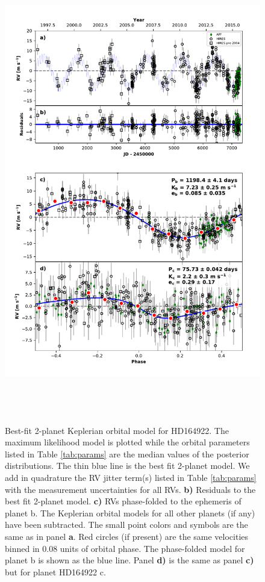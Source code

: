 \documentclass{emulateapj}
\begin{document}
\begin{figure}[!h]
\centering
\includegraphics[height=8.0in,width=6.0in,keepaspectratio]{HD164922_rv_multipanel.pdf}
\caption{
Best-fit 2-planet Keplerian orbital model for HD164922.
The maximum likelihood model is plotted while the orbital parameters listed in Table \ref{tab:params}
are the median values of the posterior distributions.
The thin blue line is the best fit 2-planet model. We add in quadrature the RV jitter term(s) listed in Table \ref{tab:params}
with the measurement uncertainties for all RVs.
{\bf b)} Residuals to the best fit 2-planet model.
{\bf c)} RVs phase-folded to the ephemeris of planet b. The Keplerian orbital models for all other planets (if any) have been subtracted.
The small point colors and symbols are the same as in panel {\bf a}.
Red circles (if present) are the same velocities binned in 0.08 units of orbital phase.
The phase-folded model for planet b is shown as the blue line.
Panel {\bf d)} is the same as panel {\bf c)} but for planet HD164922 c.
}
\end{figure}
\end{document}
